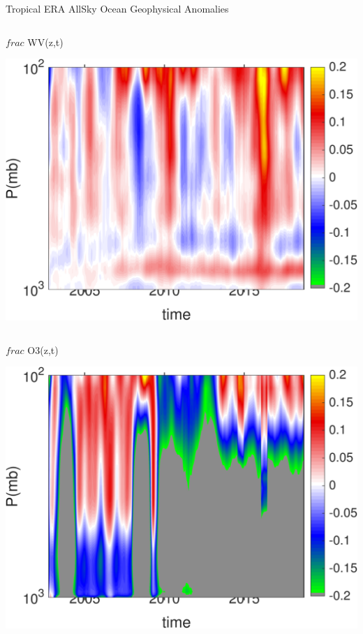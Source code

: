 \documentclass[10pt,t]{beamer}
\begin{document}
\begin{frame}{Tropical ERA AllSky Ocean Geophysical Anomalies}
\begin{columns}
\begin{column}{0.45\columnwidth}
\begin{block}{\footnotesize $frac$ WV(z,t)}
\vspace{-0.1in}
\begin{center}
\includegraphics[width=\linewidth]{Figs/CloudAnom/Desc_ocean_orig/era_cld_wv_anom_200209_201808.png}
\end{center}
\end{block}
\end{column}
\end{columns}

\vspace{-0.25in}

\begin{columns}
\begin{column}{0.45\columnwidth}
\begin{block}{\footnotesize $frac$ O3(z,t)}
\vspace{-0.1in}
\begin{center}
\includegraphics[width=\linewidth]{Figs/CloudAnom/Desc_ocean_orig/era_cld_o3_anom_200209_201808.png}
\end{center}
\end{block}
\end{column}


\end{columns}
\end{frame}
\end{document}
